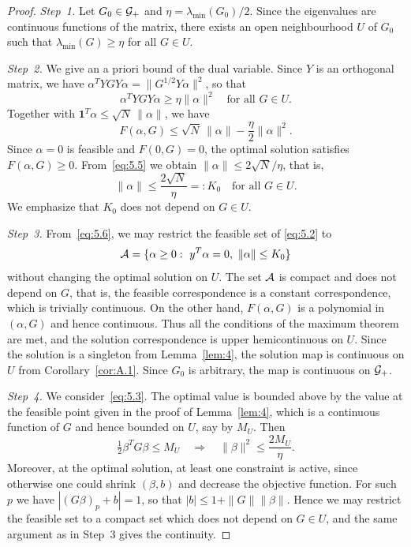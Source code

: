 \begin{proof}
\textit{Step~1.} Let $G_0\in\mathcal{G}_+$ and $\eta=\lambda_{\min}(G_0)/2$. Since the
eigenvalues are continuous functions of the matrix, there exists an open
neighbourhood $U$ of $G_0$ such that $\lambda_{\min}(G)\ge\eta$ for all $G\in U$.

\textit{Step~2.} We give an a priori bound of the dual variable. Since $Y$ is an
orthogonal matrix, we have $\alpha^TYGY\alpha=\|G^{1/2}Y\alpha\|^2$, so that
\[
\alpha^TYGY\alpha\ge\eta\|\alpha\|^2
\quad\text{for all }G\in U.
\]
Together with $\mathbf{1}^T\alpha\le\sqrt{N}\,\|\alpha\|$, we have
\begin{equation}
F(\alpha,G)\le\sqrt{N}\,\|\alpha\|-\frac{\eta}{2}\|\alpha\|^2.
\label{eq:5.5}
\end{equation}
Since $\alpha=0$ is feasible and $F(0,G)=0$, the optimal solution satisfies
$F(\alpha,G)\ge 0$. From~\eqref{eq:5.5} we obtain
$\|\alpha\|\le 2\sqrt{N}/\eta$, that is,
\begin{equation}
\|\alpha\|\le\frac{2\sqrt{N}}{\eta}=:K_0
\quad\text{for all }G\in U.
\label{eq:5.6}
\end{equation}
We emphasize that $K_0$ does not depend on $G\in U$.

\textit{Step~3.} From~\eqref{eq:5.6}, we may restrict the feasible set of
\eqref{eq:5.2} to
\[
\mathcal{A}=\{\alpha\ge 0:\ y^T\alpha=0,\ \|\alpha\|\le K_0\}
\]
without changing the optimal solution on $U$. The set $\mathcal{A}$ is compact and does
not depend on $G$, that is, the feasible correspondence is a constant
correspondence, which is trivially continuous. On the other hand, $F(\alpha,G)$
is a polynomial in $(\alpha,G)$ and hence continuous. Thus all the conditions of
the maximum theorem are met, and the solution correspondence is upper
hemicontinuous on $U$. Since the solution is a singleton from Lemma~\ref{lem:4},
the solution map is continuous on $U$ from Corollary~\ref{cor:A.1}. Since $G_0$
is arbitrary, the map is continuous on $\mathcal{G}_+$.

\textit{Step~4.} We consider~\eqref{eq:5.3}. The optimal value is bounded above by
the value at the feasible point given in the proof of Lemma~\ref{lem:4}, which is
a continuous function of $G$ and hence bounded on $U$, say by $M_U$. Then
\[
\tfrac12\beta^TG\beta\le M_U
\quad\Rightarrow\quad
\|\beta\|^2\le\frac{2M_U}{\eta}.
\]
Moreover, at the optimal solution, at least one constraint is active, since
otherwise one could shrink $(\beta,b)$ and decrease the objective function. For
such $p$ we have $|(G\beta)_p+b|=1$, so that
$|b|\le 1+\|G\|\|\beta\|$. Hence we may restrict the feasible set to a compact set
which does not depend on $G\in U$, and the same argument as in Step~3 gives the
continuity.
\end{proof}

